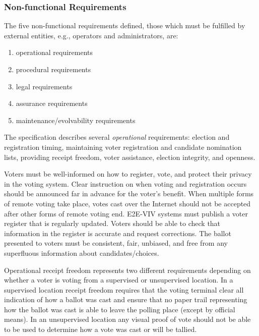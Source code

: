 \subsubsection{Non-functional Requirements}
The five non-functional requirements defined, those which must be fulfilled by
external entities, e.g., operators and administrators, are:\cite{e2e-viv}

\begin{enumerate}
    \item operational requirements
    \item procedural requirements
    \item legal requirements
    \item assurance requirements
    \item maintenance/evolvability requirements
\end{enumerate}

The specification describes several \emph{operational} requirements: election
and registration timing, maintaining voter registration and candidate
nomination lists, providing receipt freedom, voter assistance, election
integrity, and openness.

Voters must be well-informed on how to register, vote, and protect their privacy
in the voting system.
Clear instruction on when voting and registration occurs should be announced far
in advance for the voter's benefit. When multiple forms of remote voting take
place, votes cast over the Internet should not be accepted after other forms of
remote voting end.
E2E-VIV systems must publish a voter register that is regularly updated. Voters
should be able to check that information in the register is accurate and request
corrections.
The ballot presented to voters must be consistent, fair, unbiased, and free from
any superfluous information about candidates/choices.

Operational receipt freedom represents two different requirements depending on
whether a voter is voting from a supervised or unsupervised location. In a
supervised location receipt freedom requires that the voting terminal clear all
indication of how a ballot was cast and ensure that no paper trail representing
how the ballot was cast is able to leave the polling place (except by official
means). In an unsupervised location any visual proof of vote should not be able
to be used to determine how a vote was cast or will be tallied.

